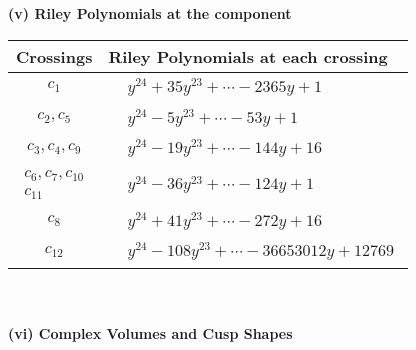 \documentclass[1p]{elsarticle_modified}
\theoremstyle{definition}
\begin{document}
\newpage\renewcommand{\arraystretch}{1}
\flushleft \textbf{(v) Riley Polynomials at the component}\newline \\
\begin{tabular}{m{50pt}|m{274pt}}
Crossings & \hspace{64pt}Riley Polynomials at each crossing \\
\hline $$\begin{aligned}c_{1}\end{aligned}$$&$\begin{aligned}
&y^{24}+35 y^{23}+\cdots-2365 y+1
\end{aligned}$\\
\hline $$\begin{aligned}c_{2},c_{5}\end{aligned}$$&$\begin{aligned}
&y^{24}-5 y^{23}+\cdots-53 y+1
\end{aligned}$\\
\hline $$\begin{aligned}c_{3},c_{4},c_{9}\end{aligned}$$&$\begin{aligned}
&y^{24}-19 y^{23}+\cdots-144 y+16
\end{aligned}$\\
\hline $$\begin{aligned}c_{6},c_{7},c_{10}\\c_{11}\end{aligned}$$&$\begin{aligned}
&y^{24}-36 y^{23}+\cdots-124 y+1
\end{aligned}$\\
\hline $$\begin{aligned}c_{8}\end{aligned}$$&$\begin{aligned}
&y^{24}+41 y^{23}+\cdots-272 y+16
\end{aligned}$\\
\hline $$\begin{aligned}c_{12}\end{aligned}$$&$\begin{aligned}
&y^{24}-108 y^{23}+\cdots-36653012 y+12769
\end{aligned}$\\
\hline
\end{tabular}\\~\\
\newpage\flushleft \textbf{(vi) Complex Volumes and Cusp Shapes}
\end{document}
